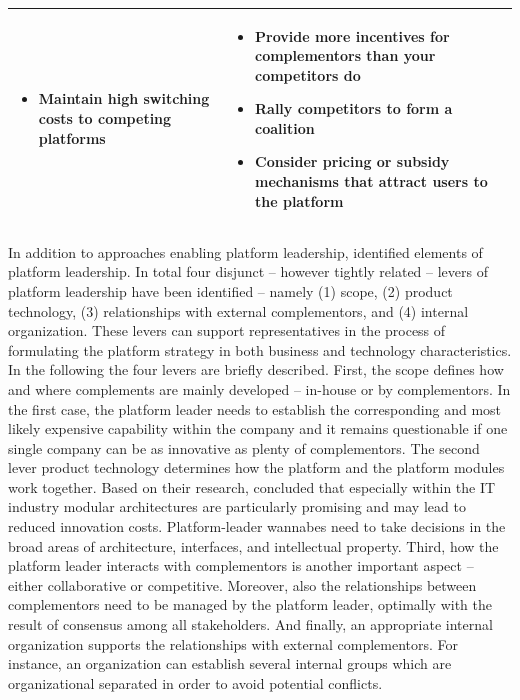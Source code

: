 \begin{table}[t]
\begin{tabular}{L{.45\textwidth}L{.45\textwidth}}
\begin{itemize}[leftmargin=*, parsep=0pt, topsep=0pt, itemsep=0pt]
				\item \small Maintain high switching costs to competing platforms	\vspace{-\baselineskip} 
			\end{itemize} &
			\vspace{-4mm}
			\begin{itemize}[leftmargin=*, parsep=0pt, topsep=0pt, itemsep=0pt]
				\item \small Provide more incentives for complementors than your competitors do
				\item \small Rally competitors to form a coalition
				\item \small Consider pricing or subsidy mechanisms that attract users to the platform \vspace{-\baselineskip} 
			\end{itemize} \\ \bottomrule
	\end{tabular}
\end{table}

In addition to approaches enabling platform leadership, \citet{Cusumano2002} identified elements of platform leadership. In total four disjunct -- however tightly related -- levers of platform leadership have been identified -- namely (1) scope, (2) product technology, (3) relationships with external complementors, and (4) internal organization. These levers can support representatives in the process of formulating the platform strategy in both business and technology characteristics. In the following the four levers are briefly described. First, the scope defines how and where complements are mainly developed -- in-house or by complementors. In the first case, the platform leader needs to establish the corresponding and most likely expensive capability within the company and it remains questionable if one single company can be as innovative as plenty of complementors. The second lever product technology determines how the platform and the platform modules work together. Based on their research, \citet[pp. 55-56]{Cusumano2002} concluded that especially within the \ac{IT} industry modular architectures are particularly promising and may lead to reduced innovation costs. Platform-leader wannabes need to take decisions in the broad areas of architecture, interfaces, and intellectual property. Third, how the platform leader interacts with complementors is another important aspect -- either collaborative or competitive. Moreover, also the relationships between complementors need to be managed by the platform leader, optimally with the result of consensus among all stakeholders. And finally, an appropriate internal organization supports the relationships with external complementors. For instance, an organization can establish several internal groups which are organizational separated in order to avoid potential conflicts.

